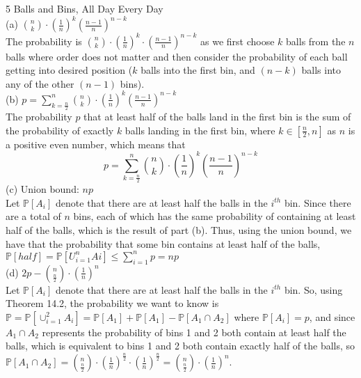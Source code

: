 \documentclass{article}
\begin{document}
{\Large 5 Balls and Bins, All Day Every Day} \\[.5cm]
{\color{red} (a) $\binom{n}{k}\cdot(\frac{1}{n})^{k}(\frac{n-1}{n})^{n-k}$ } \\

The probability is $\binom{n}{k}\cdot(\frac{1}{n})^{k}\cdot(\frac{n-1}{n})^{n-k}$ as we first choose $k$ balls from the $n$ balls where order does not matter and then consider the probability of each ball getting into desired position ($k$ balls into the first bin, and $(n-k)$ balls into any of the other $(n-1)$ bins). \\[.5cm]
{\color{red} (b) $p = \sum\limits_{k=\frac{n}{2}}^n \binom{n}{k}\cdot(\frac{1}{n})^{k}(\frac{n-1}{n})^{n-k}$ } \\

The probability $p$ that at least half of the balls land in the first bin is the sum of the probability of exactly $k$ balls landing in the first bin, where $k\in[\frac{n}{2}, n]$ as $n$ is a positive even number, which means that
$$p = \sum\limits_{k=\frac{n}{2}}^n \binom{n}{k}\cdot(\frac{1}{n})^{k}(\frac{n-1}{n})^{n-k}$$
{\color{red} (c) Union bound: $np$ } \\

Let $\mathbb{P}[A_i]$ denote that there are at least half the balls in the $i^{th}$ bin.
Since there are a total of $n$ bins, each of which has the same probability of containing at least half of the balls, which is the result of part (b). Thus, using the union bound, we have that the probability that some bin contains at least half of the balls,
$\mathbb{P}[half] = \mathbb{P}[U_{i=1}^n Ai] \leq
\sum\limits_{i=1}^n p = np $ \\[.5cm]
{\color{red} (d) $2p - \binom{n}{\frac{n}{2}} \cdot (\frac{1}{n})^n$ } \\

Let $\mathbb{P}[A_i]$ denote that there are at least half the balls in the $i^{th}$ bin.
So, using Theorem 14.2, the probability we want to know is
$\mathbb{P} = \mathbb{P}[\cup_{i=1}^2 A_i] =
\mathbb{P}[A_1] + \mathbb{P}[A_1] - \mathbb{P}[A_1\cap A_2]$
where $\mathbb{P}[A_i] = p$, and since $A_1\cap A_2$ represents the probability of bins 1 and 2 both contain at least half the balls, which is equivalent to bins 1 and 2 both contain exactly half of the balls, so
$\mathbb{P}[A_1\cap A_2] =
\binom{n}{\frac{n}{2}} \cdot (\frac{1}{n})^{\frac{n}{2}} \cdot (\frac{1}{n})^{\frac{n}{2}} =
\binom{n}{\frac{n}{2}} \cdot (\frac{1}{n})^n$. \\
\end{document}
